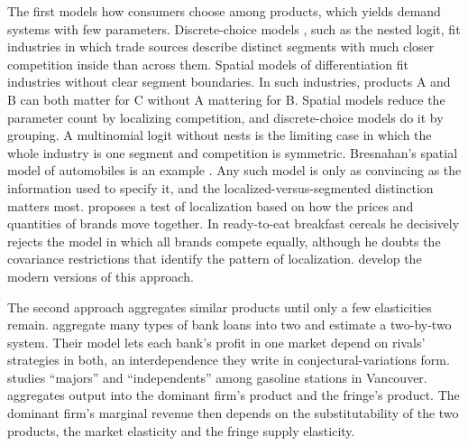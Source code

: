 The first models how consumers choose among products, which yields demand systems with few parameters. Discrete-choice
models \citep[see][]{McFadden1984}, such as the nested logit, fit industries in which trade sources describe distinct
segments with much closer competition inside than across them. Spatial models of differentiation fit industries without
clear segment boundaries. In such industries, products A and B can both matter for C without A mattering for B. Spatial
models reduce the parameter count by localizing competition, and discrete-choice models do it by grouping. A
multinomial logit without nests is the limiting case in which the whole industry is one segment and competition is
symmetric. Bresnahan's spatial model of automobiles is an example \citep{Bresnahan1981,Bresnahan1987}. Any such model
is only as convincing as the information used to specify it, and the localized-versus-segmented distinction matters most.
\citet{Schmalensee1985b} proposes a test of localization based on how the prices and quantities of brands move together.
In ready-to-eat breakfast cereals he decisively rejects the model in which all brands compete equally, although he doubts
the covariance restrictions that identify the pattern of localization.  develop the
modern versions of this approach.

The second approach aggregates similar products until only a few elasticities remain. \citet{GelfandSpiller1987}
aggregate many types of bank loans into two and estimate a two-by-two system. Their model lets each bank's profit in
one market depend on rivals' strategies in both, an interdependence they write in conjectural-variations form.
\citet{Slade1987} studies ``majors'' and ``independents'' among gasoline stations in Vancouver. \citet{Suslow1986}
aggregates output into the dominant firm's product and the fringe's product. The dominant firm's marginal revenue then
depends on the substitutability of the two products, the market elasticity and the fringe supply elasticity.


